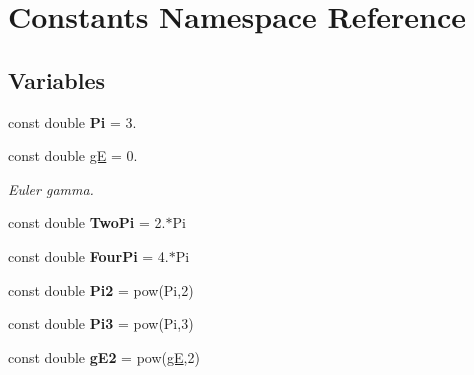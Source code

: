 \hypertarget{namespaceConstants}{}\section{Constants Namespace Reference}
\label{namespaceConstants}
\subsection*{Variables}
\begin{DoxyCompactItemize}
\item 
\hypertarget{namespaceConstants_adb9aa880bc34f3cff694a340ad170c10}{}const double {\bfseries Pi} = 3.\label{namespaceConstants_adb9aa880bc34f3cff694a340ad170c10}

\item 
\hypertarget{namespaceConstants_a8a027fd9c5c87bae9d3571a115f6d8cf}{}const double \hyperlink{namespaceConstants_a8a027fd9c5c87bae9d3571a115f6d8cf}{g\+E} = 0.\label{namespaceConstants_a8a027fd9c5c87bae9d3571a115f6d8cf}

\begin{DoxyCompactList}\small\item\em Euler gamma. \end{DoxyCompactList}\item 
\hypertarget{namespaceConstants_aaf6799440b9624a61a8b213b21b536fb}{}const double {\bfseries Two\+Pi} = 2.$\ast$Pi\label{namespaceConstants_aaf6799440b9624a61a8b213b21b536fb}

\item 
\hypertarget{namespaceConstants_a86e62976c774f6df27fd18cf6020ceef}{}const double {\bfseries Four\+Pi} = 4.$\ast$Pi\label{namespaceConstants_a86e62976c774f6df27fd18cf6020ceef}

\item 
\hypertarget{namespaceConstants_a2819e031d2a12a5259760946c6531d25}{}const double {\bfseries Pi2} = pow(Pi,2)\label{namespaceConstants_a2819e031d2a12a5259760946c6531d25}

\item 
\hypertarget{namespaceConstants_ad4c3d7aaece345450b7f607399d9aa8f}{}const double {\bfseries Pi3} = pow(Pi,3)\label{namespaceConstants_ad4c3d7aaece345450b7f607399d9aa8f}

\item 
\hypertarget{namespaceConstants_a0fc0b0cd64b8a7161a5f246c4e133135}{}const double {\bfseries g\+E2} = pow(\hyperlink{namespaceConstants_a8a027fd9c5c87bae9d3571a115f6d8cf}{g\+E},2)\label{namespaceConstants_a0fc0b0cd64b8a7161a5f246c4e133135}


\end{DoxyCompactItemize}

